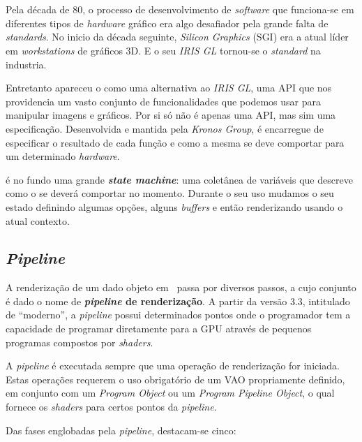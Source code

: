 \section{\opengl}
\label{sec::arte:opengl}

Pela década de 80, o processo de desenvolvimento de \textit{software} que funciona-se em diferentes tipos de \textit{hardware} gráfico era algo desafiador pela grande falta de \textit{standards}. No inicio da década seguinte, \textit{Silicon Graphics} (SGI) era a atual líder em \textit{workstations} de gráficos 3D. E o seu \textit{IRIS GL} tornou-se o \textit{standard} na industria.

Entretanto apareceu o \opengl como uma alternativa ao \textit{IRIS GL}, uma \ac{API} que nos providencia um vasto conjunto de funcionalidades que podemos usar para manipular imagens e gráficos. Por si só \opengl não é apenas uma \ac{API}, mas sim uma especificação. Desenvolvida e mantida pela \textit{Kronos Group}, é encarregue de especificar o resultado de cada função e como a mesma se deve comportar para um determinado \textit{hardware}.

\opengl é no fundo uma grande \textbf{\textit{state machine}}: uma coletânea de variáveis que descreve como o \opengl se deverá comportar no momento. Durante o seu uso mudamos o seu estado definindo algumas opções, alguns \textit{buffers} e então renderizando usando o atual contexto.

\subsection{\textit{Pipeline}}
\label{ssec::arte:opengl:pipeline}

A renderização de um dado objeto em \opengl~passa por diversos passos, a cujo conjunto é dado o nome de \textbf{\textit{pipeline} de renderização}. A partir da versão 3.3, intitulado de ``\opengl moderno'', a \textit{pipeline} possui determinados pontos onde o programador tem a capacidade de programar diretamente para a \ac{GPU} através de pequenos programas compostos por \textit{shaders}.

A \textit{pipeline} é executada sempre que uma operação de renderização for iniciada. Estas operações requerem o uso obrigatório de um \ac{VAO} propriamente definido, em conjunto com um \textit{Program Object} ou um \textit{Program Pipeline Object}, o qual fornece os \textit{shaders} para certos pontos da \textit{pipeline}.

Das fases englobadas pela \textit{pipeline}, destacam-se cinco:

